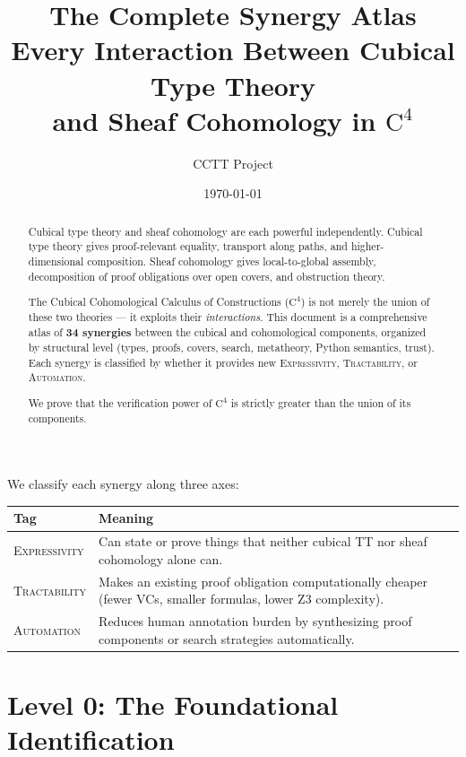 \documentclass[11pt,a4paper]{article}
\title{%
  \textbf{The Complete Synergy Atlas}\\[6pt]
  \Large Every Interaction Between Cubical Type Theory\\
  and Sheaf Cohomology in $\mathrm{C}^4$
}
\author{CCTT Project}
\date{\today}
\theoremstyle{definition}
\theoremstyle{plain}
\begin{document}
\maketitle

\begin{abstract}
Cubical type theory and sheaf cohomology are each powerful
independently.  Cubical type theory gives proof-relevant equality,
transport along paths, and higher-dimensional composition.  Sheaf
cohomology gives local-to-global assembly, decomposition of proof
obligations over open covers, and obstruction theory.

The Cubical Cohomological Calculus of Constructions ($\mathrm{C}^4$)
is not merely the union of these two theories --- it exploits their
\emph{interactions}.  This document is a comprehensive atlas of
\textbf{34 synergies} between the cubical and cohomological
components, organized by structural level (types, proofs, covers,
search, metatheory, Python semantics, trust).  Each synergy is
classified by whether it provides new \textsc{Expressivity},
\textsc{Tractability}, or \textsc{Automation}.

We prove that the verification power of $\mathrm{C}^4$ is strictly
greater than the union of its components.
\end{abstract}

\tableofcontents
\newpage

\noindent
We classify each synergy along three axes:

\begin{center}
\begin{tabular}{lp{10cm}}
\toprule
\textbf{Tag} & \textbf{Meaning} \\
\midrule
\textsc{Expressivity} &
  Can state or prove things that neither cubical TT nor sheaf
  cohomology alone can. \\
\textsc{Tractability} &
  Makes an existing proof obligation computationally cheaper
  (fewer VCs, smaller formulas, lower Z3 complexity). \\
\textsc{Automation} &
  Reduces human annotation burden by synthesizing proof
  components or search strategies automatically. \\
\bottomrule
\end{tabular}
\end{center}


\section{Level 0: The Foundational Identification}
\label{sec:syn-foundation}
\end{document}
